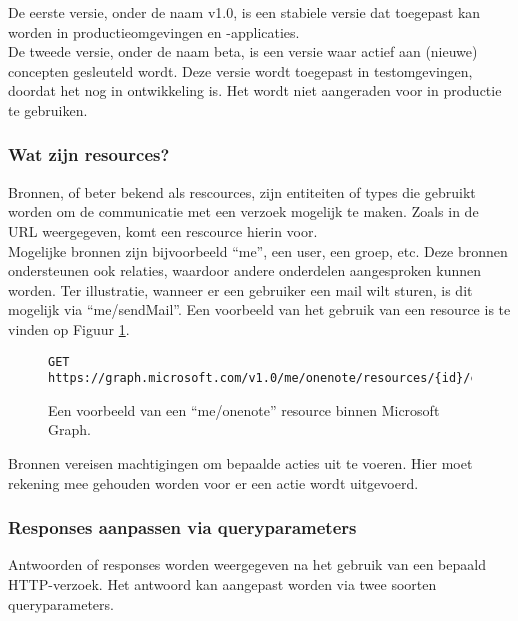 De eerste versie, onder de naam v1.0, is een stabiele versie dat toegepast kan worden in productieomgevingen en -applicaties. \\

De tweede versie, onder de naam beta, is een versie waar actief aan (nieuwe) concepten gesleuteld wordt. Deze versie wordt toegepast in testomgevingen, doordat het nog in ontwikkeling is. Het wordt niet aangeraden voor in productie te gebruiken. 

\subsubsection{Wat zijn resources?}

Bronnen, of beter bekend als rescources, zijn entiteiten of types die gebruikt worden om de communicatie met een verzoek mogelijk te maken. Zoals in de \ac{URL} weergegeven, komt een rescource hierin voor. \\

Mogelijke bronnen zijn bijvoorbeeld “me”, een user, een groep, etc. Deze bronnen ondersteunen ook relaties, waardoor andere onderdelen aangesproken kunnen worden. Ter illustratie, wanneer er een gebruiker een mail wilt sturen, is dit mogelijk via “me/sendMail”. Een voorbeeld van het gebruik van een resource is te vinden op Figuur \ref{MSGR}. \\

\begin{figure}[h]
    \footnotesize\begin{verbatim}GET https://graph.microsoft.com/v1.0/me/onenote/resources/{id}/content
    \end{verbatim}    
    \caption[Voorbeeld Microsoft Graph resource]{Een voorbeeld van een “me/onenote” resource binnen Microsoft Graph.}
    \label{MSGR}
\end{figure}

Bronnen vereisen machtigingen om bepaalde acties uit te voeren. Hier moet rekening mee gehouden worden voor er een actie wordt uitgevoerd.

\subsubsection{Responses aanpassen via queryparameters}

Antwoorden of responses worden weergegeven na het gebruik van een bepaald HTTP-verzoek. Het antwoord kan aangepast worden via twee soorten queryparameters. \\

